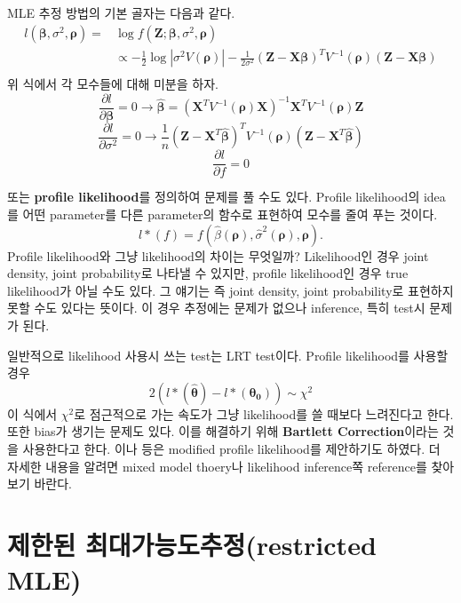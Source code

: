 \documentclass[b5paper,]{scrbook}
\theoremstyle{plain}
\theoremstyle{definition}
\numberwithin{equation}{section}
\begin{document}
MLE 추정 방법의 기본 골자는 다음과 같다.
\[
\begin{aligned}
l(\boldsymbol{\beta},\sigma^{2}, \boldsymbol{\rho})=&\log f(\mathbf{Z};\boldsymbol{\beta},\sigma^{2},\boldsymbol{\rho})\\
&\varpropto -\frac{1}{2}\log |\sigma^{2}V(\boldsymbol{\rho})| -\frac{1}{2\sigma^{2}}(\mathbf{Z}-\mathbf{X}\boldsymbol{\beta})^{T}V^{-1}(\boldsymbol{\rho})(\mathbf{Z}-\mathbf{X}\boldsymbol{\beta})\\
\end{aligned}
\]
위 식에서 각 모수들에 대해 미분을 하자.
\[\frac{\partial l}{\partial \boldsymbol{\beta}}=0 \rightarrow \hat{\boldsymbol{\beta}}=(\mathbf{X}^{T}V^{-1}(\boldsymbol{\rho})\mathbf{X})^{-1}\mathbf{X}^{T}V^{-1}(\boldsymbol{\rho})\mathbf{Z}\]
\[\frac{\partial l}{\partial \sigma^{2}}=0 \rightarrow \frac{1}{n}(\mathbf{Z}-\mathbf{X}^{T}\hat{\boldsymbol{\beta}})^{T}V^{-1}(\boldsymbol{\rho})(\mathbf{Z}-\mathbf{X}^{T}\hat{\boldsymbol{\beta}})\]
\[\frac{\partial l}{\partial f}=0\]

또는 \textbf{profile likelihood}를 정의하여 문제를 풀 수도 있다. Profile likelihood의 idea를 어떤 parameter를 다른 parameter의 함수로 표현하여 모수를 줄여 푸는 것이다.
\[l*(f)=f(\hat{\beta}(\boldsymbol{\rho}), \hat{\sigma}^{2}(\boldsymbol{\rho}),\boldsymbol{\rho}).\]
Profile likelihood와 그냥 likelihood의 차이는 무엇일까? Likelihood인 경우 joint density, joint probability로 나타낼 수 있지만, profile likelihood인 경우 true likelihood가 아닐 수도 있다. 그 얘기는 즉 joint density, joint probability로 표현하지 못할 수도 있다는 뜻이다. 이 경우 추정에는 문제가 없으나 inference, 특히 test시 문제가 된다.

일반적으로 likelihood 사용시 쓰는 test는 LRT test이다. Profile likelihood를 사용할 경우
\[2(l*(\hat{\boldsymbol{\theta}})-l*(\boldsymbol{\theta_{0}})) \sim \chi^{2}\]
이 식에서 \(\chi^{2}\)로 점근적으로 가는 속도가 그냥 likelihood를 쓸 때보다 느려진다고 한다. 또한 bias가 생기는 문제도 있다. 이를 해결하기 위해 \textbf{Bartlett Correction}이라는 것을 사용한다고 한다. \citep{BarndorfF-Nielsen1983}이나 \citep{Cox1987} 등은 modified profile likelihood를 제안하기도 하였다. 더 자세한 내용을 알려면 mixed model thoery나 likelihood inference쪽 reference를 찾아보기 바란다.

\hypertarget{-restricted-mle}{%
\section{제한된 최대가능도추정(restricted MLE)}\label{-restricted-mle}}
\end{document}

